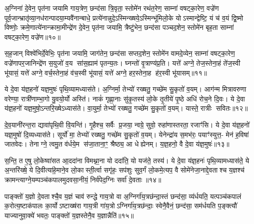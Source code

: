 अ॒ग्निना॑ दे॒वेन॒ पृत॑ना जयामि गाय॒त्रेण॒ छन्द॑सा त्रि॒वृता॒ स्तोमे॑न रथंत॒रेण॒ साम्ना॑ वषट्का॒रेण॒ वज्रे॑ण पूर्व॒जान्भ्रातृ॑व्या॒नध॑रान्पादया॒म्यवै॑नान्बाधे॒ प्रत्ये॑नान्नुदे॒ऽस्मिन्ख्षये॒ऽस्मिन्भू॑मिलो॒के योऽस्मान्द्वेष्टि॒ यं च॑ व॒यं द्वि॒ष्मो विष्णोः॒ क्रमे॒णात्ये॑नान्क्रामा॒मीन्द्रे॑ण दे॒वेन॒ पृत॑ना जयामि॒ त्रैष्टु॑भेन॒ छन्द॑सा पञ्चद॒शेन॒ स्तोमे॑न बृह॒ता साम्ना॑ वषट्का॒रेण॒ वज्रे॑ण॥१०॥

स॒ह॒जान् विश्वे॑भिर्दे॒वेभिः॒ पृत॑ना जयामि॒ जाग॑तेन॒ छन्द॑सा सप्तद॒शेन॒ स्तोमे॑न वामदे॒व्येन॒ साम्ना॑ वषट्का॒रेण॒ वज्रे॑णापर॒जानिन्द्रे॑ण स॒युजो॑ व॒य सा॑स॒ह्याम॑ पृतन्य॒तः। घ्नन्तो॑ वृ॒त्राण्य॑प्र॒ति। यत्ते॑ अग्ने॒ तेज॒स्तेना॒हं ते॑ज॒स्वी भू॑यासं॒ यत्ते॑ अग्ने॒ वर्च॒स्तेना॒हं व॑च॒स्वी भू॑यासं॒ यत्ते॑ अग्ने॒ हर॒स्तेना॒ह ह॑र॒स्वी भू॑यासम्॥११॥

{\anuvakamend[{बृ॒ह॒ता साम्ना॑ वषट्का॒रेण॒ वज्रे॑ण॒ षट्च॑त्वारिशच्च॥३॥}]}

ये दे॒वा य॑ज्ञ॒हनो॑ यज्ञ॒मुषः॑ पृथि॒व्यामध्यास॑ते। अ॒ग्निर्मा॒ तेभ्यो॑ रख्षतु॒ गच्छे॑म सु॒कृतो॑ व॒यम्। आग॑न्म मित्रावरुणा वरेण्या॒ रात्री॑णाम्भा॒गो यु॒वयो॒र्यो अस्ति॑। नाकं॑ गृह्णा॒नाः सु॑कृ॒तस्य॑ लो॒के तृ॒तीये॑ पृ॒ष्ठे अधि॑ रोच॒ने दि॒वः। ये दे॒वा य॑ज्ञ॒हनो॑ यज्ञ॒मुषो॒ऽन्तरि॒ख्षेऽध्यास॑ते। वा॒युर्मा॒ तेभ्यो॑ रख्षतु॒ गच्छे॑म सु॒कृतो॑ व॒यम्। यास्ते॒ रात्रीः सवितः॥१२॥

दे॒व॒यानी॑रन्त॒रा द्यावा॑पृथि॒वी वि॒यन्ति॑। गृ॒हैश्च॒ सर्वैः प्र॒जया॒ न्वग्रे॒ सुवो॒ रुहा॑णास्तरता॒ रजाꣳ॑सि। ये दे॒वा य॑ज्ञ॒हनो॑ यज्ञ॒मुषो॑ दि॒व्यध्यास॑ते। सूर्यो॑ मा॒ तेभ्यो॑ रख्षतु॒ गच्छे॑म सु॒कृतो॑ व॒यम्। येनेन्द्रा॑य स॒मभ॑रः॒ पयाꣳ॑स्युत्त॒- मेन॑ ह॒विषा॑ जातवेदः। तेनाग्ने॒ त्वमु॒त व॑र्धये॒म स॑जा॒ताना॒ꣳ॒ श्रैष्ठ्य॒ आ धेह्येनम्। य॒ज्ञ॒हनो॒ वै दे॒वा य॑ज्ञ॒मुषः॑॥१३॥

स॒न्ति॒ त ए॒षु लो॒केष्वा॑सत आ॒ददा॑ना विमथ्ना॒ना यो ददा॑ति॒ यो यज॑ते॒ तस्य॑। ये दे॒वा य॑ज्ञ॒हनः॑ पृथि॒व्यामध्यास॑ते॒ ये अ॒न्तरि॑ख्षे॒ ये दि॒वीत्या॑हे॒माने॒व लो॒कास्ती॒र्त्वा सगृ॑हः॒ सप॑शुः सुव॒र्गं लो॒कमे॒त्यप॒ वै सोमे॑नेजा॒नाद्दे॒वताश्च य॒ज्ञश्च॑ क्रामन्त्याग्ने॒यम्पञ्च॑कपालमुदवसा॒नीयं॒ निर्व॑पेद॒ग्निः सर्वा॑ दे॒वताः॥१४॥

पाङ्क्तो॑ य॒ज्ञो दे॒वताश्चै॒व य॒ज्ञं चाव॑ रुन्द्धे गाय॒त्रो वा अ॒ग्निर्गा॑य॒त्रछ॑न्दा॒स्तं छन्द॑सा॒ व्य॑र्धयति॒ यत्पञ्च॑कपालं क॒रोत्य॒ष्टाक॑पालः का॒र्योऽष्टाख्ष॑रा गाय॒त्री गा॑य॒त्रोऽग्निर्गा॑य॒त्रछ॑न्दाः॒ स्वेनै॒वैनं॒ छन्द॑सा॒ सम॑र्धयति प॒ङ्क्त्यौ॑ याज्यानुवा॒क्ये॑ भवतः॒ पाङ्क्तो॑ य॒ज्ञस्तेनै॒व य॒ज्ञान्नैति॑॥१५॥

{\anuvakamend[{स॒वि॒त॒र्दे॒वा य॑ज्ञ॒मुषः॒ सर्वा॑ दे॒वता॒स्त्रिच॑त्वारिशच्च॥४॥}]}


